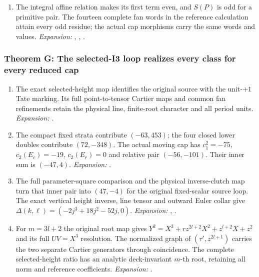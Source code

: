 \begin{enumerate}[label=\arabic*.,leftmargin=*]
\item\hypertarget{step-IV-F-7}{} The integral affine relation makes its first term even,
and $S(P)$ is odd for a primitive pair. The fourteen complete
fan words in the reference calculation attain every odd residue;
the actual cap morphisms carry the same words and values.
\textit{Expansion:} , , .

\end{enumerate}

\hypertarget{outline-IV-G}{}
\subsubsection*{Theorem G: The selected-I3 loop realizes every class for every reduced cap}
\begin{enumerate}[label=\arabic*.,leftmargin=*]

\item\hypertarget{step-IV-G-1}{} The exact selected-height map identifies the original
source with the unit-$+1$ Tate marking. Its full point-to-tensor
Cartier maps and common fan refinements retain the physical line,
finite-root character and all period units.
\textit{Expansion:} .

\item\hypertarget{step-IV-G-2}{} The compact fixed strata contribute $(-63,453)$; the four
closed lower doubles contribute $(72,-348)$. The actual moving
cap has $c_1^2=-75$, $c_2(E_c)=-19$, $c_2(E_r)=0$ and relative
pair $(-56,-101)$. Their inner sum is $(-47,4)$.
\textit{Expansion:} .

\item\hypertarget{step-IV-G-3}{} The full parameter-square comparison and the physical
inverse-clutch map turn that inner pair into $(47,-4)$ for the
original fixed-scalar source loop. The exact vertical height
inverse, line tensor and outward Euler collar give
$\Delta(k,\ell)=(-2j^3+18j^2-52j,0)$.
\textit{Expansion:} , .

\item\hypertarget{step-IV-G-4}{} For $m=3l+2$ the original root map gives
$Y^2=X^3+rz^{2l+2}X^2+z^{l+2}X+z^2$ and its full $UV=X^3$
resolution. The normalized graph of $(\tau',z^{2l+1})$ carries
the two separate Cartier generators through coincidence.
The complete selected-height ratio has an analytic deck-invariant
$m$-th root, retaining all norm and reference coefficients.
\textit{Expansion:} .


\end{enumerate}
